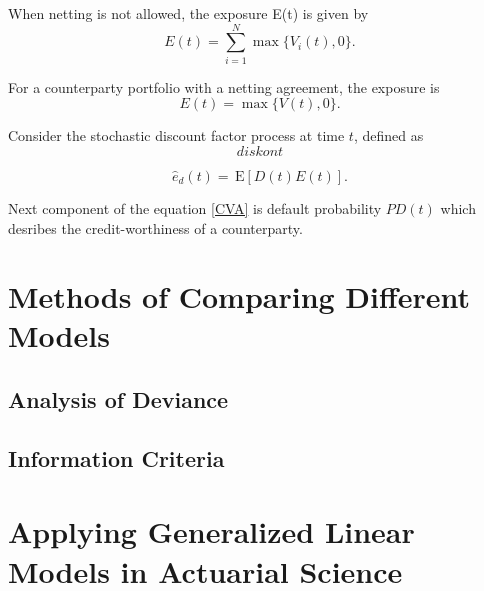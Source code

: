 \documentclass{amsart}
\theoremstyle{definition}\newtheorem{definition}[theorem]{Definition}
\theoremstyle{remark}\newtheorem{remark}[theorem]{Remark}
\newcommand{\E}{\,\mathrm{E}}
\begin{document}
When netting is not allowed, the exposure E(t) is given by
\begin{equation}
E(t)=\sum_{i=1}^N\max\{V_i(t),0\}.
\end{equation}

For a counterparty portfolio with a netting agreement, the exposure is
\begin{equation}
E(t)=\max\{V(t),0\}.
\end{equation}

Consider the stochastic discount factor process at time $t$, defined as 
\begin{equation}
diskont
\end{equation}

\begin{equation}
\hat{e}_d(t)=\E[D(t) E(t)].
\end{equation}

Next component of the equation \eqref{CVA} is default probability $PD(t)$ which desribes the credit-worthiness of a counterparty. 


\section{Methods of Comparing Different Models}

\subsection{Analysis of Deviance}

\subsection{Information Criteria}
\section{Applying Generalized Linear Models in Actuarial Science}

\begin{table}
\caption{Resulting CVA}

\end{table}
\end{document}

